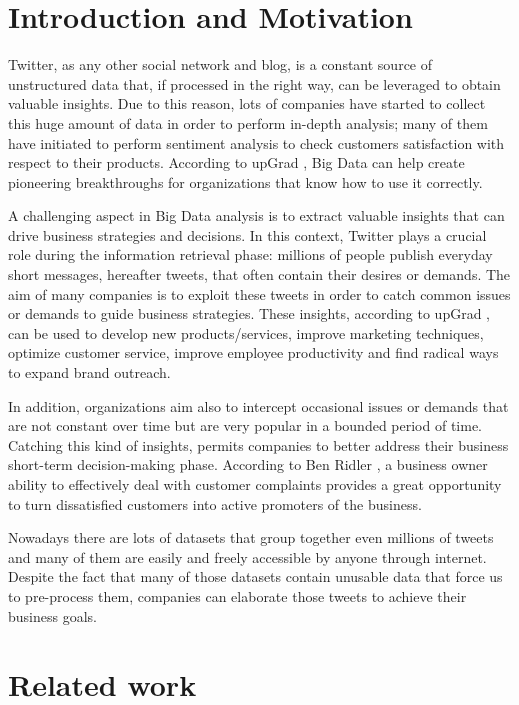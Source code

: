 \section{Introduction and Motivation}
Twitter, as any other social network and blog, is a constant source of unstructured data that, if processed in the right way, can be leveraged to obtain valuable insights. Due to this reason, lots of companies have started to collect this huge amount of data in order to perform in-depth analysis; many of them have initiated to perform sentiment analysis to check customers satisfaction with respect to their products. According to upGrad \cite{upGrad}, Big Data can help create pioneering breakthroughs for organizations that know how to use it correctly.

A challenging aspect in Big Data analysis is to extract valuable insights that can drive business strategies and decisions. In this context, Twitter plays a crucial role during the information retrieval phase: millions of people publish everyday short messages, hereafter tweets, that often contain their desires or demands. The aim of many companies is to exploit these tweets in order to catch common issues or demands to guide business strategies. These insights, according to upGrad \cite{upGrad}, can be used to develop new products/services, improve marketing techniques, optimize customer service, improve employee productivity and find radical ways to expand brand outreach.

In addition, organizations aim also to intercept occasional issues or demands that are not constant over time but are very popular in a bounded period of time. Catching this kind of insights, permits companies to better address their business short-term decision-making phase. According to Ben Ridler \cite{customer-satistaction}, a business owner ability to effectively deal with customer complaints provides a great opportunity to turn dissatisfied customers into active promoters of the business.

Nowadays there are lots of datasets that group together even millions of tweets and many of them are easily and freely accessible by anyone through internet. Despite the fact that many of those datasets contain unusable data that force us to pre-process them, companies can elaborate those tweets to achieve their business goals.

\section{Related work}


